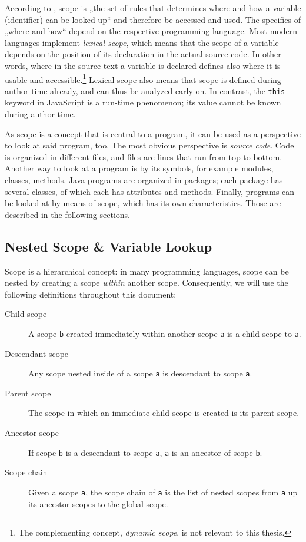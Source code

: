 According to , scope is „the set of rules that
determines where and how a \gls{variable} (\gls{identifier}) can be
looked-up“ and therefore be accessed and used. The specifics of „where
and how“ depend on the respective programming language. Most modern
languages implement \emph{lexical scope}, which means that the scope of
a variable depends on the position of its declaration in the actual
source code. In other words, where in the source text a variable is
declared defines also where it is usable and
accessible.\footnote{The complementing concept, \emph{dynamic scope}, is not relevant to this thesis.}
Lexical scope also means that scope is defined during author-time
already, and can thus be analyzed early on. In contrast, the
\texttt{this} keyword in JavaScript is a run-time phenomenon; its value
cannot be known during author-time.

As scope is a concept that is central to a program, it can be used as a
perspective to look at said program, too. The most obvious perspective
is \emph{source code}. Code is organized in different files, and files
are lines that run from top to bottom. Another way to look at a program
is by its symbols, for example modules, classes, methods. Java programs
are organized in packages; each package has several classes, of which
each has attributes and methods. Finally, programs can be looked at by
means of scope, which has its own characteristics. Those are described
in the following sections.

\subsection{Nested Scope \& Variable
Lookup}\label{nested-scope-variable-lookup}

Scope is a hierarchical concept: in many programming languages, scope
can be nested by creating a scope \emph{within} another scope.
Consequently, we will use the following definitions throughout this
document:

\begin{description}
\item[Child scope]
A scope \texttt{b} created immediately within another scope \texttt{a}
is a child scope to \texttt{a}.
\item[Descendant scope]
Any scope nested inside of a scope \texttt{a} is descendant to scope
\texttt{a}.
\item[Parent scope]
The scope in which an immediate child scope is created is its parent
scope.
\item[Ancestor scope]
If scope \texttt{b} is a descendant to scope \texttt{a}, \texttt{a} is
an ancestor of scope \texttt{b}.
\item[Scope chain]
Given a scope \texttt{a}, the scope chain of \texttt{a} is the list of
nested scopes from \texttt{a} up its ancestor scopes to the global
scope.
\end{description}


